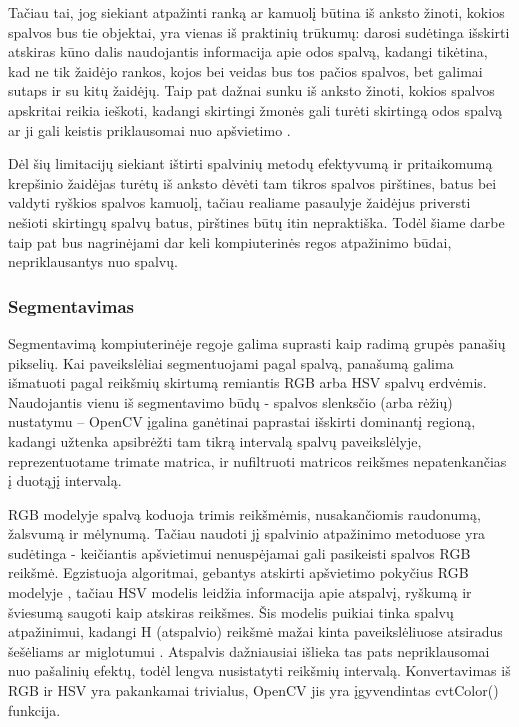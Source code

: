 \documentclass{VUMIFPSbakalaurinis}
\begin{document}
Tačiau tai, jog siekiant atpažinti ranką ar kamuolį būtina iš anksto žinoti, kokios spalvos bus tie objektai, yra vienas iš praktinių trūkumų: darosi sudėtinga išskirti atskiras kūno dalis naudojantis informacija apie odos spalvą, kadangi tikėtina, kad ne tik žaidėjo rankos, kojos bei veidas bus tos pačios spalvos, bet galimai sutaps ir su kitų žaidėjų. Taip pat dažnai sunku iš anksto žinoti, kokios spalvos apskritai reikia ieškoti, kadangi skirtingi žmonės gali turėti skirtingą odos spalvą ar ji gali keistis priklausomai nuo apšvietimo \cite{KAKUMANU20071106}. 

Dėl šių limitacijų siekiant ištirti spalvinių metodų efektyvumą ir pritaikomumą krepšinio žaidėjas turėtų iš anksto dėvėti tam tikros spalvos pirštines, batus bei valdyti ryškios spalvos kamuolį, tačiau realiame pasaulyje žaidėjus priversti nešioti skirtingų spalvų batus, pirštines būtų itin nepraktiška. Todėl šiame darbe taip pat bus nagrinėjami dar keli kompiuterinės regos atpažinimo būdai, nepriklausantys nuo spalvų. 

\subsubsection{Segmentavimas}
Segmentavimą kompiuterinėje regoje galima suprasti kaip radimą grupės panašių pikselių. Kai paveikslėliai segmentuojami pagal spalvą, panašumą galima išmatuoti pagal reikšmių skirtumą remiantis RGB arba HSV spalvų erdvėmis. Naudojantis vienu iš segmentavimo būdų - spalvos slenksčio (arba rėžių) nustatymu – OpenCV įgalina ganėtinai paprastai išskirti dominantį regioną, kadangi užtenka apsibrėžti tam tikrą intervalą spalvų paveikslėlyje, reprezentuotame trimate matrica, ir nufiltruoti matricos reikšmes nepatenkančias į duotąjį intervalą. 

RGB modelyje spalvą koduoja trimis reikšmėmis, nusakančiomis raudonumą, žalsvumą ir mėlynumą. Tačiau naudoti jį spalvinio atpažinimo metoduose yra sudėtinga - keičiantis apšvietimui nenuspėjamai gali pasikeisti spalvos RGB reikšmė. Egzistuoja algoritmai, gebantys atskirti apšvietimo pokyčius RGB modelyje \cite{1220504}, tačiau HSV modelis leidžia informacija apie atspalvį, ryškumą ir šviesumą saugoti kaip atskiras reikšmes. Šis modelis puikiai tinka spalvų atpažinimui, kadangi H (atspalvio) reikšmė mažai kinta paveikslėliuose atsiradus šešėliams \cite{1039893} ar miglotumui \cite{7457892}. Atspalvis dažniausiai išlieka tas pats nepriklausomai nuo pašalinių efektų, todėl lengva nusistatyti reikšmių intervalą. Konvertavimas iš RGB ir HSV yra pakankamai trivialus, OpenCV jis yra įgyvendintas cvtColor() funkcija. 
\end{document}
